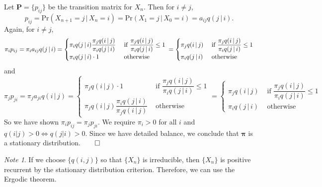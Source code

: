 \documentclass[11pt]{article}\usepackage[]{graphicx}\usepackage[]{color}
\numberwithin{algorithm}{section}
\theoremstyle{remark}
\newtheorem*{mynote}{Note}
\theoremstyle{definition}
\newenvironment{Proof}{\begin{trivlist}
\item[\hskip \labelsep \textit{Proof}:]}{\end{trivlist}}
\begin{document}
\begin{Proof}
Let $\mathbf{P} = \{p_{ij}\}$ be the transition matrix for $X_n$. Then for $i \ne j$,
\begin{equation*}
  p_{ij} = \text{Pr}(X_{n+1} = j \,|\, X_n = i) =  \text{Pr}(X_1 = j \,|\, X_0 = i)
  = a_{ij} q(j\,|\,i).
\end{equation*}
Again, for $i \ne j$,
\begin{equation*}
  \pi_i p_{ij} = \pi_i a_{ij} q(j \,|\, i) = 
  \begin{cases}
    \pi_i q(j \,|\, i) \dfrac{\pi_j q(i \,|\, j)}{\pi_i q(j \,|\, i)} & \text{ if }
    \dfrac{\pi_j q(i \,|\, j)}{\pi_i q(j \,|\, i)} \le 1 \\
    \pi_i q(j \,|\, i) \cdot 1 & \text{ otherwise }
  \end{cases} \\
  = 
  \begin{cases}
    \pi_j q(i \,|\, j) & \text{ if }
    \dfrac{\pi_j q(i \,|\, j)}{\pi_i q(j \,|\, i)} \le 1 \\
    \pi_i q(j \,|\, i) & \text{ otherwise }
  \end{cases}
\end{equation*}
and
\begin{equation*}
  \pi_j p_{ji} = \pi_j a_{ji} q(i\,|\, j) = \begin{cases}
    \pi_j q(i\,|\, j) \cdot 1
    & \text{ if }
    \dfrac{\pi_j q(i\,|\, j)}{\pi_i q(j\,|\, i)} \le 1 \\
    \pi_j q(i\,|\, j) \dfrac{\pi_i q(j\,|\, i)}{\pi_j q(i\,|\, j)}  &
    \text{ otherwise }
  \end{cases}
  = \begin{cases}
    \pi_j q(i \,|\, j) &
    \text{ if } \dfrac{\pi_j q(i \,|\, j)}{\pi_i q(j \,|\, i)} \le 1 \\
    \pi_i q(j \,|\, i) &
    \text{ otherwise }
  \end{cases}
\end{equation*}
So we have shown $\pi_i p_{ij} = \pi_j p_{ji}$. We require $\pi_i > 0$ for all $i$ and 
$q(i |j) > 0 \Leftrightarrow q(j|i) > 0$.  Since we have detailed balance, we conclude that 
$\boldsymbol{\pi}$ is a stationary distribution.$\qed$
\end{Proof}

\begin{mynote}
  If we choose $\{q(i,j)\}$ so that $\{X_n\}$ is irreducible, then $\{X_n\}$
  is positive recurrent by the stationary distribution criterion.
  Therefore, we can use the Ergodic theorem.
\end{mynote}
\end{document}
